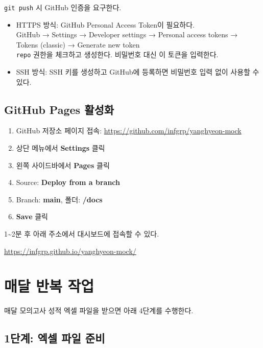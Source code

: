 \documentclass[11pt,a4paper]{article}
\begin{document}
\begin{notebox}
\texttt{git push} 시 GitHub 인증을 요구한다. 
\begin{itemize}
  \item HTTPS 방식: GitHub Personal Access Token이 필요하다.\\
    GitHub → Settings → Developer settings → Personal access tokens → Tokens (classic) → Generate new token\\
    \texttt{repo} 권한을 체크하고 생성한다. 비밀번호 대신 이 토큰을 입력한다.
  \item SSH 방식: SSH 키를 생성하고 GitHub에 등록하면 비밀번호 입력 없이 사용할 수 있다.
\end{itemize}
\end{notebox}

\subsection{GitHub Pages 활성화}

\begin{enumerate}
  \item GitHub 저장소 페이지 접속: \url{https://github.com/infgrp/yanghyeon-mock}
  \item 상단 메뉴에서 \textbf{Settings} 클릭
  \item 왼쪽 사이드바에서 \textbf{Pages} 클릭
  \item Source: \textbf{Deploy from a branch}
  \item Branch: \textbf{main}, 폴더: \textbf{/docs}
  \item \textbf{Save} 클릭
\end{enumerate}

1\textasciitilde2분 후 아래 주소에서 대시보드에 접속할 수 있다.

\begin{successbox}
\url{https://infgrp.github.io/yanghyeon-mock/}
\end{successbox}


\section{매달 반복 작업}

매달 모의고사 성적 엑셀 파일을 받으면 아래 4단계를 수행한다.

\subsection{1단계: 엑셀 파일 준비}
\end{document}
